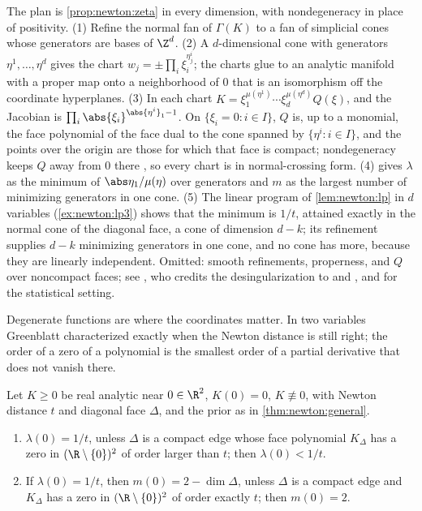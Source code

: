 \begin{refsection}
\begin{proofsketch}
The plan is \cref{prop:newton:zeta} in every dimension, with nondegeneracy in place of positivity. (1) Refine the normal fan of $\Gamma(K)$ to a fan of simplicial cones whose generators are bases of $\Z^d$. (2) A $d$-dimensional cone with generators $\eta^1,\dots,\eta^d$ gives the chart $w_j=\pm\prod_i\xi_i^{\eta^i_j}$; the charts glue to an analytic manifold with a proper map onto a neighborhood of $0$ that is an isomorphism off the coordinate hyperplanes. (3) In each chart $K=\xi_1^{\mu(\eta^1)}\cdots\xi_d^{\mu(\eta^d)}Q(\xi)$, and the Jacobian is $\prod_i\abs{\xi_i}^{\abs{\eta^i}_1-1}$. On $\{\xi_i=0:i\in I\}$, $Q$ is, up to a monomial, the face polynomial of the face dual to the cone spanned by $\{\eta^i:i\in I\}$, and the points over the origin are those for which that face is compact; nondegeneracy keeps $Q$ away from $0$ there \parencite[Theorem~4.8]{Lin2017}, so every chart is in normal-crossing form. (4)  gives $\lambda$ as the minimum of $\abs\eta_1/\mu(\eta)$ over generators and $m$ as the largest number of minimizing generators in one cone. (5) The linear program of \cref{lem:newton:lp} in $d$ variables (\cref{ex:newton:lp3}) shows that the minimum is $1/t$, attained exactly in the normal cone of the diagonal face, a cone of dimension $d-k$; its refinement supplies $d-k$ minimizing generators in one cone, and no cone has more, because they are linearly independent. Omitted: smooth refinements, properness, and $Q$ over noncompact faces; see \textcite[Section~4]{Lin2017}, who credits the desingularization to \textcite{Varchenko1976} and \textcite[Section~8.3]{ArnoldEtAl1988}, and \textcite[Section~3]{Watanabe2024} for the statistical setting.
\end{proofsketch}

Degenerate functions are where the coordinates matter. In two variables Greenblatt characterized exactly when the Newton distance is still right; the order of a zero of a polynomial is the smallest order of a partial derivative that does not vanish there.

\begin{theorem}\label{thm:newton:greenblatt}
Let $K\ge0$ be real analytic near $0\in\R^2$, $K(0)=0$, $K\not\equiv0$, with Newton distance $t$ and diagonal face $\Delta$, and the prior as in \cref{thm:newton:general}.
\begin{enumerate}
\item $\lambda(0)=1/t$, unless $\Delta$ is a compact edge whose face polynomial $K_\Delta$ has a zero in $(\R\setminus\{0\})^2$ of order larger than $t$; then $\lambda(0)<1/t$.
\item If $\lambda(0)=1/t$, then $m(0)=2-\dim\Delta$, unless $\Delta$ is a compact edge and $K_\Delta$ has a zero in $(\R\setminus\{0\})^2$ of order exactly $t$; then $m(0)=2$.
\end{enumerate}
\end{theorem}


\end{refsection}
